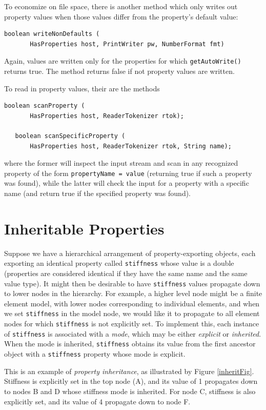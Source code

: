 To economize on file space, there is another method 
which only writes out property values when those 
values differ from the property's default value:
\begin{lstlisting}[]
   boolean writeNonDefaults (
       HasProperties host, PrintWriter pw, NumberFormat fmt)
\end{lstlisting}
Again, values are written only for the properties for which 
{\tt getAutoWrite()} returns true. The method returns false if not property
values are written.

To read in property values, their are the methods 
\begin{lstlisting}[]
   boolean scanProperty (
       HasProperties host, ReaderTokenizer rtok);

   boolean scanSpecificProperty (
       HasProperties host, ReaderTokenizer rtok, String name);
\end{lstlisting}
where the former will inspect the input stream and scan in any
recognized property of the form {\tt propertyName = value} (returning
true if such a property was found), while the latter will check the
input for a property with a specific name (and return true if the
specified property was found).

\section{Inheritable Properties}

Suppose we have a hierarchical arrangement of property-exporting
objects, each exporting an identical property called {\tt stiffness}
whose value is a double (properties are considered identical if they
have the same name and the same value type). It might then be
desirable to have {\tt stiffness} values propagate down to lower nodes
in the hierarchy. For example, a higher level node might be a finite
element model, with lower nodes corresponding to individual elements,
and when we set {\tt stiffness} in the model node, we would like it to
propagate to all element nodes for which {\tt stiffness} is not
explicitly set. To implement this, each instance of {\tt stiffness} is
associated with a {\it mode}, which may be either {\it explicit} or
{\it inherited}. When the mode is inherited, {\tt stiffness} obtains
its value from the first ancestor object with a {\tt stiffness}
property whose mode is explicit.

This is an example of {\it property inheritance}, as illustrated by
Figure \ref{inheritFig}. Stiffness is explicitly set in the top node
(A), and its value of 1 propagates down to nodes B and D whose
stiffness mode is inherited. For node C, stiffness is also explicitly
set, and its value of 4 propagate down to node F.

